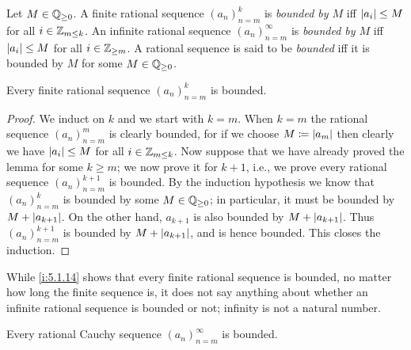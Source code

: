 \begin{defn}\label{i:5.1.12}
  Let \(M \in \mathbb{Q}_{\geq 0}\).
  A finite rational sequence \((a_n)_{n = m}^k\) is \emph{bounded by \(M\)} iff \(\left\lvert a_i\right\rvert \leq M\) for all \(i \in \mathbb{Z}_{m \leq k}\).
  An infinite rational sequence \((a_n)_{n = m}^{\infty}\) is \emph{bounded by \(M\)} iff \(\left\lvert a_i\right\rvert \leq M\) for all \(i \in \mathbb{Z}_{\geq m}\).
  A rational sequence is said to be \emph{bounded} iff it is bounded by \(M\) for some \(M \in \mathbb{Q}_{\geq 0}\).
\end{defn}

\setcounter{thm}{13}
\begin{lem}\label{i:5.1.14}
  Every finite rational sequence \((a_n)_{n = m}^k\) is bounded.
\end{lem}

\begin{proof}
  We induct on \(k\) and we start with \(k = m\).
  When \(k = m\) the rational sequence \((a_n)_{n = m}^m\) is clearly bounded, for if we choose \(M \coloneqq \left\lvert a_m\right\rvert\) then clearly we have \(\left\lvert a_i\right\rvert \leq M\) for all \(i \in \mathbb{Z}_{m \leq k}\).
  Now suppose that we have already proved the lemma for some \(k \geq m\);
  we now prove it for \(k + 1\), i.e., we prove every rational sequence \((a_n)_{n = m}^{k + 1}\) is bounded.
  By the induction hypothesis we know that \((a_n)_{n = m}^k\) is bounded by some \(M \in \mathbb{Q}_{\geq 0}\);
  in particular, it must be bounded by \(M + \left\lvert a_{k + 1}\right\rvert\).
  On the other hand, \(a_{k + 1}\) is also bounded by \(M + \left\lvert a_{k + 1}\right\rvert\).
  Thus \((a_n)_{n = m}^{k + 1}\) is bounded by \(M + \left\lvert a_{k + 1}\right\rvert\), and is hence bounded.
  This closes the induction.
\end{proof}

\begin{note}
  While \cref{i:5.1.14} shows that every finite rational sequence is bounded, no matter how long the finite sequence is, it does not say anything about whether an infinite rational sequence is bounded or not;
  infinity is not a natural number.
\end{note}

\begin{lem}\label{i:5.1.15}
  Every rational Cauchy sequence \((a_n)_{n = m}^{\infty}\) is bounded.
\end{lem}

